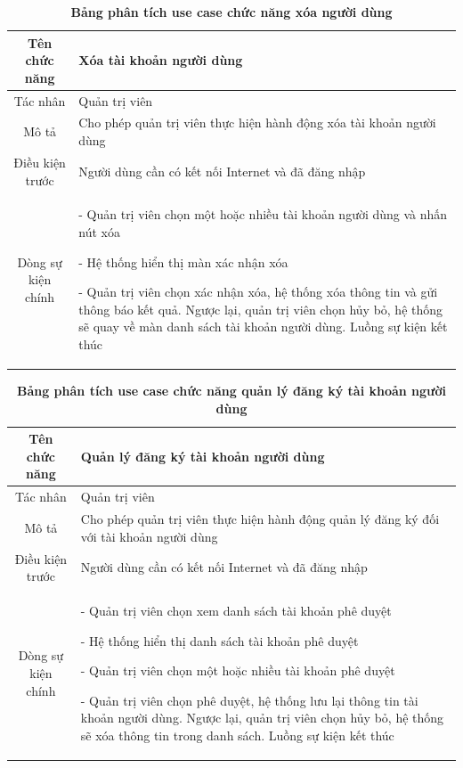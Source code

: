   \begin{table}[H]
    \caption{\bfseries \fontsize{12pt}{0pt}\selectfont Bảng phân tích use case chức năng xóa người dùng}
    \centering
    \begin{tabularx}{0.9\textwidth}{|c|X|}
      \hline
      \textbf{Tên chức năng} & \textbf{Xóa tài khoản người dùng} \\
      \hline
      Tác nhân & Quản trị viên \\
      \hline
      Mô tả & Cho phép quản trị viên thực hiện hành động xóa tài khoản người dùng \\
      \hline
      Điều kiện trước & Người dùng cần có kết nối Internet và đã đăng nhập \\
      \hline
      Dòng sự kiện chính & 
        - Quản trị viên chọn một hoặc nhiều tài khoản người dùng và nhấn nút xóa

        - Hệ thống hiển thị màn xác nhận xóa

        - Quản trị viên chọn xác nhận xóa, hệ thống xóa thông tin và gửi thông báo kết quả. Ngược lại, quản trị viên 
        chọn hủy bỏ, hệ thống sẽ quay về màn danh sách tài khoản người dùng. Luồng sự kiện kết thúc
        \\
      \hline
    \end{tabularx}
  \end{table}

  \begin{table}[H]
    \caption{\bfseries \fontsize{12pt}{0pt}\selectfont Bảng phân tích use case chức năng quản lý đăng ký tài khoản người dùng}
    \centering
    \begin{tabularx}{0.9\textwidth}{|c|X|}
      \hline
      \textbf{Tên chức năng} & \textbf{Quản lý đăng ký tài khoản người dùng} \\
      \hline
      Tác nhân & Quản trị viên \\
      \hline
      Mô tả & Cho phép quản trị viên thực hiện hành động quản lý đăng ký đối với tài khoản người dùng \\
      \hline
      Điều kiện trước & Người dùng cần có kết nối Internet và đã đăng nhập \\
      \hline
      Dòng sự kiện chính & 
        - Quản trị viên chọn xem danh sách tài khoản phê duyệt

        - Hệ thống hiển thị danh sách tài khoản phê duyệt

        - Quản trị viên chọn một hoặc nhiều tài khoản phê duyệt

        - Quản trị viên chọn phê duyệt, hệ thống lưu lại thông tin tài khoản người dùng. Ngược lại, quản trị viên 
        chọn hủy bỏ, hệ thống sẽ xóa thông tin trong danh sách. Luồng sự kiện kết thúc        
        \\
      \hline
    \end{tabularx}
  \end{table}

